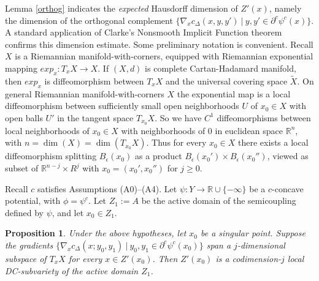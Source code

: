 \documentclass[12pt]{amsart}
\newtheorem{prop}{Proposition}
\theoremstyle{definition}
\theoremstyle{remark}
\newcommand{\bR}{\mathbb{R}}
\newcommand{\del}{\partial}
\newcommand{\cd}{c_\Delta}
\begin{document}








Lemma \ref{orthog} indicates the \emph{expected} Hausdorff dimension of $Z'(x)$, namely the dimension of the orthogonal complement $\{\nabla_x \cd(x,y,y')~|~ y,y' \in \del^c \psi^c(x)\}$. 
A standard application of Clarke's Nonsmooth Implicit Function theorem confirms this dimension estimate. Some preliminary notation is convenient. Recall $X$ is a Riemannian manifold-with-corners, equipped with Riemannian exponential mapping $exp_x:T_x X \to X$. If $(X,d)$ is complete Cartan-Hadamard manifold, then $exp_x$ is diffeomorphism between $T_x X$ and the universal covering space $\tilde{X}$. On general Riemannian manifold-with-corners $X$ the exponential map is a local diffeomorphism between sufficiently small open neighborhoods $U$ of $x_0 \in X$ with open balls $U'$ in the tangent space $T_{x_0} X$. So we have $C^1$ diffeomorphisms between local neighborhoods of $x_0 \in X$ with neighborhoods of $0$ in euclidean space $\bR^n$, with $n=\dim(X)=\dim(T_{x_0} X)$. Thus for every $x_0 \in X$ there exists a local diffeomorphism splitting $B_\epsilon(x_0)$ as a product $B_\epsilon(x_0') \times B_\epsilon(x_0'')$, viewed as subset of $\bR^{n-j} \times R^j$ with $x_0=(x_0', x_0'')$ for $j\geq 0$. 

Recall $c$ satisfies Assumptions (A0)--(A4). Let $\psi:Y\to \bR \cup \{-\infty\}$ be a $c$-concave potential, with $\phi=\psi^c$. Let $Z_1:=A$ be the active domain of the semicoupling defined by $\psi$, and let $x_0\in Z_1$. 
\begin{prop}
\label{dim-est} 
Under the above hypotheses, let $x_0$ be a singular point. Suppose the gradients $\{ \nabla_x \cd(x;y_0, y_1) ~|~y_0,y_1 \in \del^c \psi^c(x_0) \}$ span a $j$-dimensional subspace of $T_{x}X$ for every $x \in Z'(x_0)$. Then $Z'(x_0)$ is a codimension-$j$ local DC-subvariety of the active domain $Z_1$.

\end{prop}
\end{document}
